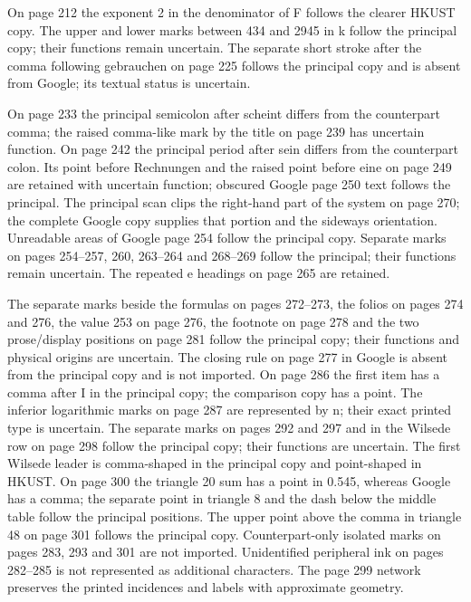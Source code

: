 On page 212 the exponent 2 in the denominator of F follows the clearer
HKUST copy. The upper and lower marks between 434 and 2945 in k
follow the principal copy; their functions remain uncertain. The separate
short stroke after the comma following gebrauchen on page 225 follows
the principal copy and is absent from Google; its textual status is uncertain.

On page 233 the principal semicolon after scheint differs from the counterpart comma;
the raised comma-like mark by the title on page 239 has uncertain function.
On page 242 the principal period after sein differs from the counterpart colon.
Its point before Rechnungen and the raised point before eine on page 249 are
retained with uncertain function; obscured Google page 250 text follows the principal.
The principal scan clips the right-hand part of the system on page 270;
the complete Google copy supplies that portion and the sideways orientation.
Unreadable areas of Google page 254 follow the principal copy. Separate marks
on pages 254--257, 260, 263--264 and 268--269 follow the principal; their
functions remain uncertain. The repeated e headings on page 265 are retained.

The separate marks beside the formulas on pages 272--273, the folios
on pages 274 and 276, the value 253 on page 276, the footnote on
page 278 and the two prose/display positions on page 281 follow the
principal copy; their functions and physical origins are uncertain.
The closing rule on page 277 in Google is absent from the principal
copy and is not imported.
On page 286 the first item has a comma after I in the principal copy;
the comparison copy has a point. The inferior logarithmic marks on
page 287 are represented by n; their exact printed type is uncertain.
The separate marks on pages 292 and 297 and in the Wilsede row on
page 298 follow the principal copy; their functions are uncertain.
The first Wilsede leader is comma-shaped in the principal copy and
point-shaped in HKUST. On page 300 the triangle 20 sum has a point
in 0.545, whereas Google has a comma; the separate point in triangle 8
and the dash below the middle table follow the principal positions.
The upper point above the comma in triangle 48 on page 301 follows
the principal copy. Counterpart-only isolated marks on pages 283, 293
and 301 are not imported. Unidentified peripheral ink on pages 282--285
is not represented as additional characters. The page 299 network
preserves the printed incidences and labels with approximate geometry.

